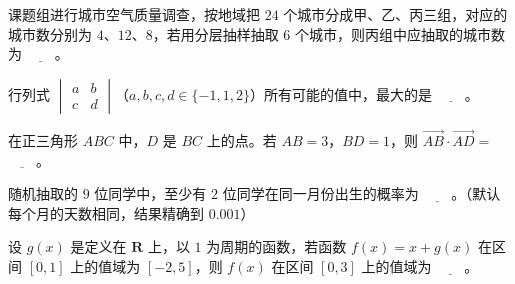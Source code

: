 \begin{question}
课题组进行城市空气质量调查，按地域把 $24$ 个城市分成甲、乙、丙三组，对应的城市数分别为 $4$、$12$、$8$，若用分层抽样抽取 $6$ 个城市，则丙组中应抽取的城市数为 $\underline{\qquad}$。

\end{question}
\begin{question}
行列式 $\begin{vmatrix}a&b\\c&d\end{vmatrix}$（$a,b,c,d\in\{-1,1,2\}$）所有可能的值中，最大的是 $\underline{\qquad}$。

\end{question}
\begin{question}
在正三角形 $ABC$ 中，$D$ 是 $BC$ 上的点。若 $AB=3$，$BD=1$，则 $\overrightarrow{AB}\cdot\overrightarrow{AD}=$ $\underline{\qquad}$。

\end{question}
\begin{question}
随机抽取的 $9$ 位同学中，至少有 $2$ 位同学在同一月份出生的概率为 $\underline{\qquad}$。（默认每个月的天数相同，结果精确到 $0.001$）

\end{question}
\begin{question}
设 $g(x)$ 是定义在 $\mathbf R$ 上，以 $1$ 为周期的函数，若函数 $f(x)=x+g(x)$ 在区间 $[0,1]$ 上的值域为 $[-2,5]$，则 $f(x)$ 在区间 $[0,3]$ 上的值域为 $\underline{\qquad}$。

\end{question}

